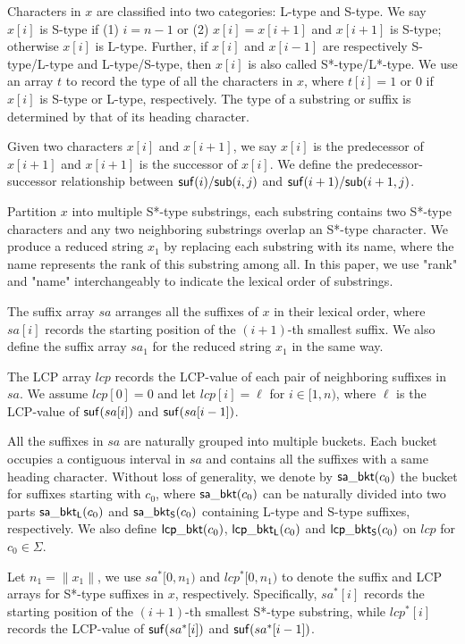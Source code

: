 \documentclass[10pt,journal,compsoc]{IEEEtran}
\begin{document}
Characters in $x$ are classified into two categories: L-type and S-type. We say $x[i]$ is S-type if (1) $i = n - 1$ or (2) $x[i] = x[i + 1]$ and $x[i + 1]$ is S-type; otherwise $x[i]$ is L-type. Further, if $x[i]$ and $x[i - 1]$ are respectively S-type/L-type and L-type/S-type, then $x[i]$ is also called S*-type/L*-type. We use an array $t$ to record the type of all the characters in $x$, where $t[i] = 1$ or $0$ if $x[i]$ is S-type or L-type, respectively. The type of a substring or suffix is determined by that of its heading character.

Given two characters $x[i]$ and $x[i + 1]$, we say $x[i]$ is the predecessor of $x[i + 1]$ and $x[i + 1]$ is the successor of $x[i]$. We define the predecessor-successor relationship between ${\sf suf}(i)/{\sf sub}(i, j)$ and ${\sf suf}(i + 1)/{\sf sub}(i + 1, j)$.

Partition $x$ into multiple S*-type substrings, each substring contains two S*-type characters and any two neighboring substrings overlap an S*-type character. We produce a reduced string $x_1$ by replacing each substring with its name, where the name represents the rank of this	 substring among all. In this paper, we use "rank" and "name" interchangeably to indicate the lexical order of substrings. 

The suffix array $sa$ arranges all the suffixes of $x$ in their lexical order, where $sa[i]$ records the starting position of the $(i + 1)$-th smallest suffix. We also define the suffix array $sa_1$ for the reduced string $x_1$ in the same way.

The LCP array $lcp$ records the LCP-value of each pair of neighboring suffixes in $sa$. We assume $lcp[0] = 0$ and let $lcp[i] = \ell$ for $i \in [1, n)$, where $\ell$ is the LCP-value of ${\sf suf}(sa[i])$ and ${\sf suf}(sa[i - 1])$.

All the suffixes in $sa$ are naturally grouped into multiple buckets. Each bucket occupies a contiguous interval in $sa$ and contains all the suffixes with a same heading character. Without loss of generality, we denote by ${\sf sa\_bkt}(c_0)$ the bucket for suffixes starting with $c_0$, where ${\sf sa\_bkt}(c_0)$ can be naturally divided into two parts ${\sf sa\_bkt_L}(c_0)$ and ${\sf sa\_bkt_S}(c_0)$ containing L-type and S-type suffixes, respectively. We also define ${\sf lcp\_bkt}(c_0)$, ${\sf lcp\_bkt_L}(c_0)$ and ${\sf lcp\_bkt_S}(c_0)$ on $lcp$ for $c_0 \in \Sigma$.

Let $n_1 = \|x_1\|$, we use $sa^*[0, n_1)$ and $lcp^*[0, n_1)$ to denote the suffix and LCP arrays for S*-type suffixes in $x$, respectively. Specifically, $sa^*[i]$ records the starting position of the $(i + 1)$-th smallest S*-type substring, while $lcp^*[i]$ records the LCP-value of ${\sf suf}(sa^*[i])$ and ${\sf suf}(sa^*[i - 1])$.
\end{document}

